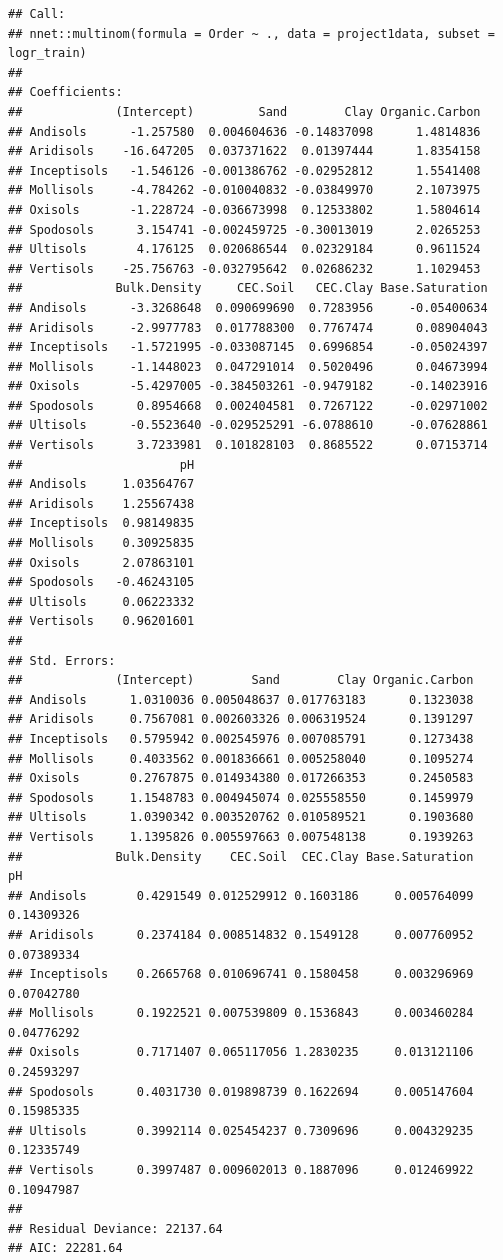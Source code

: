 \documentclass[]{article}
\begin{document}
\begin{verbatim}
## Call:
## nnet::multinom(formula = Order ~ ., data = project1data, subset = logr_train)
## 
## Coefficients:
##             (Intercept)         Sand        Clay Organic.Carbon
## Andisols      -1.257580  0.004604636 -0.14837098      1.4814836
## Aridisols    -16.647205  0.037371622  0.01397444      1.8354158
## Inceptisols   -1.546126 -0.001386762 -0.02952812      1.5541408
## Mollisols     -4.784262 -0.010040832 -0.03849970      2.1073975
## Oxisols       -1.228724 -0.036673998  0.12533802      1.5804614
## Spodosols      3.154741 -0.002459725 -0.30013019      2.0265253
## Ultisols       4.176125  0.020686544  0.02329184      0.9611524
## Vertisols    -25.756763 -0.032795642  0.02686232      1.1029453
##             Bulk.Density     CEC.Soil   CEC.Clay Base.Saturation
## Andisols      -3.3268648  0.090699690  0.7283956     -0.05400634
## Aridisols     -2.9977783  0.017788300  0.7767474      0.08904043
## Inceptisols   -1.5721995 -0.033087145  0.6996854     -0.05024397
## Mollisols     -1.1448023  0.047291014  0.5020496      0.04673994
## Oxisols       -5.4297005 -0.384503261 -0.9479182     -0.14023916
## Spodosols      0.8954668  0.002404581  0.7267122     -0.02971002
## Ultisols      -0.5523640 -0.029525291 -6.0788610     -0.07628861
## Vertisols      3.7233981  0.101828103  0.8685522      0.07153714
##                      pH
## Andisols     1.03564767
## Aridisols    1.25567438
## Inceptisols  0.98149835
## Mollisols    0.30925835
## Oxisols      2.07863101
## Spodosols   -0.46243105
## Ultisols     0.06223332
## Vertisols    0.96201601
## 
## Std. Errors:
##             (Intercept)        Sand        Clay Organic.Carbon
## Andisols      1.0310036 0.005048637 0.017763183      0.1323038
## Aridisols     0.7567081 0.002603326 0.006319524      0.1391297
## Inceptisols   0.5795942 0.002545976 0.007085791      0.1273438
## Mollisols     0.4033562 0.001836661 0.005258040      0.1095274
## Oxisols       0.2767875 0.014934380 0.017266353      0.2450583
## Spodosols     1.1548783 0.004945074 0.025558550      0.1459979
## Ultisols      1.0390342 0.003520762 0.010589521      0.1903680
## Vertisols     1.1395826 0.005597663 0.007548138      0.1939263
##             Bulk.Density    CEC.Soil  CEC.Clay Base.Saturation         pH
## Andisols       0.4291549 0.012529912 0.1603186     0.005764099 0.14309326
## Aridisols      0.2374184 0.008514832 0.1549128     0.007760952 0.07389334
## Inceptisols    0.2665768 0.010696741 0.1580458     0.003296969 0.07042780
## Mollisols      0.1922521 0.007539809 0.1536843     0.003460284 0.04776292
## Oxisols        0.7171407 0.065117056 1.2830235     0.013121106 0.24593297
## Spodosols      0.4031730 0.019898739 0.1622694     0.005147604 0.15985335
## Ultisols       0.3992114 0.025454237 0.7309696     0.004329235 0.12335749
## Vertisols      0.3997487 0.009602013 0.1887096     0.012469922 0.10947987
## 
## Residual Deviance: 22137.64 
## AIC: 22281.64
\end{verbatim}
\end{document}
